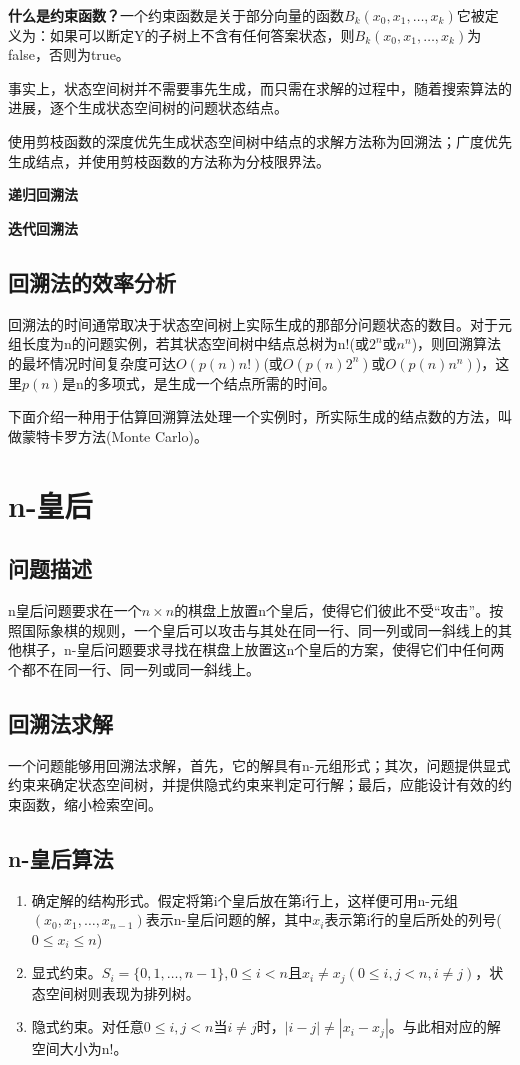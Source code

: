 \textbf{什么是约束函数？}一个约束函数是关于部分向量的函数$B_k(x_0,x_1,\dots,x_k)$它被定义为：如果可以断定Y的子树上不含有任何答案状态，则$B_k(x_0,x_1,\dots,x_k)$为false，否则为true。

事实上，状态空间树并不需要事先生成，而只需在求解的过程中，随着搜索算法的进展，逐个生成状态空间树的问题状态结点。

使用剪枝函数的深度优先生成状态空间树中结点的求解方法称为回溯法；广度优先生成结点，并使用剪枝函数的方法称为分枝限界法。

\textbf{递归回溯法}


\textbf{迭代回溯法}

\subsection*{回溯法的效率分析}
回溯法的时间通常取决于状态空间树上实际生成的那部分问题状态的数目。对于元组长度为n的问题实例，若其状态空间树中结点总树为n!(或$2^n$或$n^n$)，则回溯算法的最坏情况时间复杂度可达$O(p(n)n!)$(或$O(p(n)2^n)$或$O(p(n)n^n)$)，这里$p(n)$是n的多项式，是生成一个结点所需的时间。

下面介绍一种用于估算回溯算法处理一个实例时，所实际生成的结点数的方法，叫做蒙特卡罗方法(Monte Carlo)。

\section{n-皇后}
\subsection*{问题描述}
n皇后问题要求在一个$n\times n$的棋盘上放置n个皇后，使得它们彼此不受“攻击”。按照国际象棋的规则，一个皇后可以攻击与其处在同一行、同一列或同一斜线上的其他棋子，n-皇后问题要求寻找在棋盘上放置这n个皇后的方案，使得它们中任何两个都不在同一行、同一列或同一斜线上。
\subsection*{回溯法求解}
一个问题能够用回溯法求解，首先，它的解具有n-元组形式；其次，问题提供显式约束来确定状态空间树，并提供隐式约束来判定可行解；最后，应能设计有效的约束函数，缩小检索空间。
\subsection*{n-皇后算法}
\begin{enumerate}
	\item 确定解的结构形式。假定将第i个皇后放在第i行上，这样便可用n-元组$(x_0,x_1,\dots,x_{n-1})$表示n-皇后问题的解，其中$x_i$表示第i行的皇后所处的列号($0\leq x_i\leq n$)
	\item 显式约束。$S_i=\{0,1,\dots,n-1 \},0\leq i<n$且$x_i\ne x_j(0\leq i,j<n,i\ne j)$，状态空间树则表现为排列树。
	\item 隐式约束。对任意$0\leq i,j<n$当$i\ne j$时，$|i-j|\ne |x_i-x_j|$。与此相对应的解空间大小为n!。
\end{enumerate}
